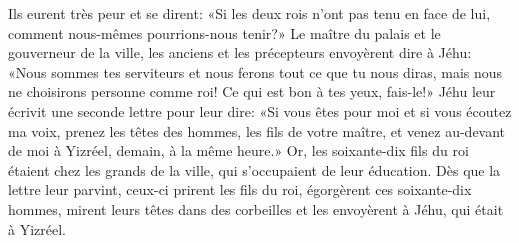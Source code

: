 Ils eurent très peur et se dirent:
	«Si les deux rois n’ont pas tenu en face de lui,
	comment nous-mêmes pourrions-nous tenir?»
Le maître du palais et le gouverneur de la ville,
	les anciens et les précepteurs envoyèrent dire à Jéhu:
	«Nous sommes tes serviteurs et nous ferons tout ce que tu nous diras,
	mais nous ne choisirons personne comme roi!
	Ce qui est bon à tes yeux, fais-le!»
Jéhu leur écrivit une seconde lettre pour leur dire:
	«Si vous êtes pour moi et si vous écoutez ma voix,
	prenez les têtes des hommes, les fils de votre maître,
	et venez au-devant de moi à Yizréel, demain, à la même heure.»
Or, les soixante-dix fils du roi étaient chez les grands de la ville,
	qui s’occupaient de leur éducation.
	Dès que la lettre leur parvint, ceux-ci prirent les fils du roi,
	égorgèrent ces soixante-dix hommes, mirent leurs têtes dans des corbeilles
	et les envoyèrent à Jéhu, qui était à Yizréel.
